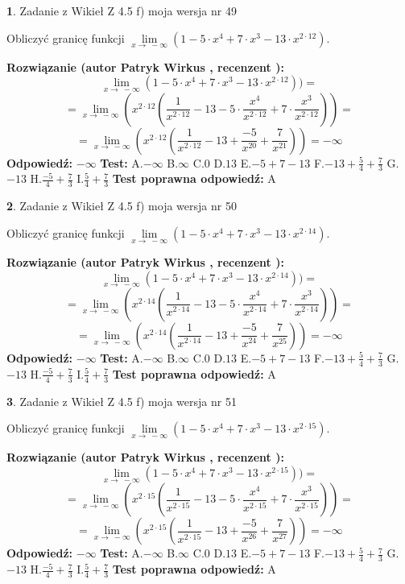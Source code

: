 \documentclass[12pt, a4paper]{article}
\theoremstyle{definition} %
\newtheorem{zad}{}
\newcommand{\zadStart}[1]{\begin{zad}#1\newline}
\newcommand{\zadStop}{\end{zad}}
\newcommand{\rozwStart}[2]{\noindent \textbf{Rozwiązanie (autor #1 , recenzent #2): }\newline}
\newcommand{\rozwStop}{\newline}
\newcommand{\odpStart}{\noindent \textbf{Odpowiedź:}\newline}
\newcommand{\odpStop}{\newline}
\newcommand{\testStart}{\noindent \textbf{Test:}\newline}
\newcommand{\testStop}{\newline}
\newcommand{\kluczStart}{\noindent \textbf{Test poprawna odpowiedź:}\newline}
\newcommand{\kluczStop}{\newline}
\begin{document}
\zadStart{Zadanie z Wikieł Z 4.5 f) moja wersja nr 49}



Obliczyć granicę funkcji  $\lim\limits_{x\to\ -\infty}(1 - 5 \cdot x^{4}+7 \cdot x^{3}- 13 \cdot x^{2\cdot12})$.
\zadStop
\rozwStart{Patryk Wirkus}{}
$$\lim\limits_{x\to\ -\infty}(1 - 5 \cdot x^{4}+7 \cdot x^{3}- 13 \cdot x^{2\cdot12}))=$$
$$=\lim\limits_{x\to\ -\infty}(x^{2\cdot12}(\frac{1}{x^{2\cdot12}}-13 -5 \cdot \frac{x^{4}}{x^{2\cdot12}}+7 \cdot \frac{x^{3}}{x^{2\cdot12}}))=$$
$$=\lim\limits_{x\to\ -\infty}(x^{2\cdot12}(\frac{1}{x^{2\cdot12}}-13 + \frac{-5}{x^{20}}+ \frac{7}{x^{21}}))=-\infty$$
\rozwStop
\odpStart
$-\infty$
\odpStop
\testStart
A.$-\infty$ B.$\infty$ C.$0$ D.$13$ E.$-5 + 7 - 13$
F.$-13+\frac{5}{4}+\frac{7}{3}$ G.$-13$
H.$\frac{-5}{4}+\frac{7}{3}$
I.$\frac{5}{4}+\frac{7}{3}$
\testStop
\kluczStart
A
\kluczStop



\zadStart{Zadanie z Wikieł Z 4.5 f) moja wersja nr 50}



Obliczyć granicę funkcji  $\lim\limits_{x\to\ -\infty}(1 - 5 \cdot x^{4}+7 \cdot x^{3}- 13 \cdot x^{2\cdot14})$.
\zadStop
\rozwStart{Patryk Wirkus}{}
$$\lim\limits_{x\to\ -\infty}(1 - 5 \cdot x^{4}+7 \cdot x^{3}- 13 \cdot x^{2\cdot14}))=$$
$$=\lim\limits_{x\to\ -\infty}(x^{2\cdot14}(\frac{1}{x^{2\cdot14}}-13 -5 \cdot \frac{x^{4}}{x^{2\cdot14}}+7 \cdot \frac{x^{3}}{x^{2\cdot14}}))=$$
$$=\lim\limits_{x\to\ -\infty}(x^{2\cdot14}(\frac{1}{x^{2\cdot14}}-13 + \frac{-5}{x^{24}}+ \frac{7}{x^{25}}))=-\infty$$
\rozwStop
\odpStart
$-\infty$
\odpStop
\testStart
A.$-\infty$ B.$\infty$ C.$0$ D.$13$ E.$-5 + 7 - 13$
F.$-13+\frac{5}{4}+\frac{7}{3}$ G.$-13$
H.$\frac{-5}{4}+\frac{7}{3}$
I.$\frac{5}{4}+\frac{7}{3}$
\testStop
\kluczStart
A
\kluczStop



\zadStart{Zadanie z Wikieł Z 4.5 f) moja wersja nr 51}



Obliczyć granicę funkcji  $\lim\limits_{x\to\ -\infty}(1 - 5 \cdot x^{4}+7 \cdot x^{3}- 13 \cdot x^{2\cdot15})$.
\zadStop
\rozwStart{Patryk Wirkus}{}
$$\lim\limits_{x\to\ -\infty}(1 - 5 \cdot x^{4}+7 \cdot x^{3}- 13 \cdot x^{2\cdot15}))=$$
$$=\lim\limits_{x\to\ -\infty}(x^{2\cdot15}(\frac{1}{x^{2\cdot15}}-13 -5 \cdot \frac{x^{4}}{x^{2\cdot15}}+7 \cdot \frac{x^{3}}{x^{2\cdot15}}))=$$
$$=\lim\limits_{x\to\ -\infty}(x^{2\cdot15}(\frac{1}{x^{2\cdot15}}-13 + \frac{-5}{x^{26}}+ \frac{7}{x^{27}}))=-\infty$$
\rozwStop
\odpStart
$-\infty$
\odpStop
\testStart
A.$-\infty$ B.$\infty$ C.$0$ D.$13$ E.$-5 + 7 - 13$
F.$-13+\frac{5}{4}+\frac{7}{3}$ G.$-13$
H.$\frac{-5}{4}+\frac{7}{3}$
I.$\frac{5}{4}+\frac{7}{3}$
\testStop
\kluczStart
A
\kluczStop
\end{document}
